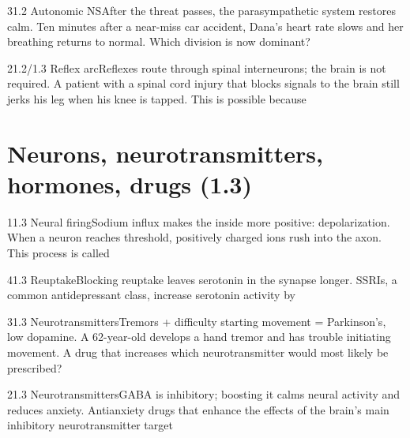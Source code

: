 \documentclass[11pt]{article}
\begin{document}
\begin{q}{3}{1.2 Autonomic NS}{After the threat passes, the parasympathetic system restores calm.}
Ten minutes after a near-miss car accident, Dana's heart rate slows and her breathing returns to normal. Which division is now dominant?
\end{q}

\begin{q}{2}{1.2/1.3 Reflex arc}{Reflexes route through spinal interneurons; the brain is not required.}
A patient with a spinal cord injury that blocks signals to the brain still jerks his leg when his knee is tapped. This is possible because
\end{q}

\section{Neurons, neurotransmitters, hormones, drugs (1.3)}

\begin{q}{1}{1.3 Neural firing}{Sodium influx makes the inside more positive: depolarization.}
When a neuron reaches threshold, positively charged ions rush into the axon. This process is called
\end{q}

\begin{q}{4}{1.3 Reuptake}{Blocking reuptake leaves serotonin in the synapse longer.}
SSRIs, a common antidepressant class, increase serotonin activity by
\end{q}

\begin{q}{3}{1.3 Neurotransmitters}{Tremors + difficulty starting movement = Parkinson's, low dopamine.}
A 62-year-old develops a hand tremor and has trouble initiating movement. A drug that increases which neurotransmitter would most likely be prescribed?
\end{q}

\begin{q}{2}{1.3 Neurotransmitters}{GABA is inhibitory; boosting it calms neural activity and reduces anxiety.}
Antianxiety drugs that enhance the effects of the brain's main inhibitory neurotransmitter target
\end{q}
\end{document}
